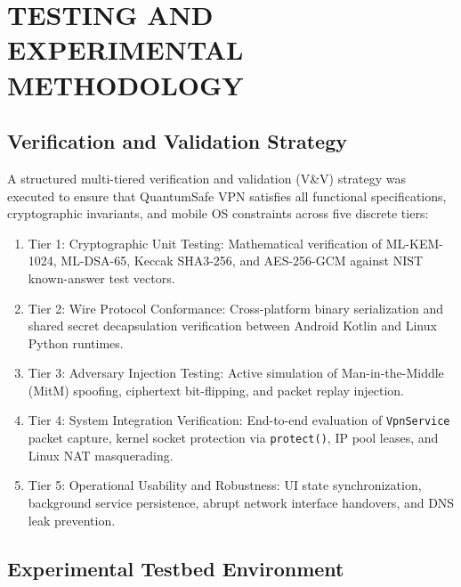 
\chapter{TESTING AND EXPERIMENTAL METHODOLOGY}
\label{chap:testing}

\section{Verification and Validation Strategy}
\label{sec:testing_strategy}

A structured multi-tiered verification and validation (V\&V) strategy was executed to ensure that QuantumSafe VPN satisfies all functional specifications, cryptographic invariants, and mobile OS constraints across five discrete tiers:
\begin{enumerate}
    \item Tier 1: Cryptographic Unit Testing: Mathematical verification of ML-KEM-1024, ML-DSA-65, Keccak SHA3-256, and AES-256-GCM against NIST known-answer test vectors.
    \item Tier 2: Wire Protocol Conformance: Cross-platform binary serialization and shared secret decapsulation verification between Android Kotlin and Linux Python runtimes.
    \item Tier 3: Adversary Injection Testing: Active simulation of Man-in-the-Middle (MitM) spoofing, ciphertext bit-flipping, and packet replay injection.
    \item Tier 4: System Integration Verification: End-to-end evaluation of \texttt{VpnService} packet capture, kernel socket protection via \texttt{protect()}, IP pool leases, and Linux NAT masquerading.
    \item Tier 5: Operational Usability and Robustness: UI state synchronization, background service persistence, abrupt network interface handovers, and DNS leak prevention.
\end{enumerate}

\section{Experimental Testbed Environment}
\label{sec:testbed_environment}

